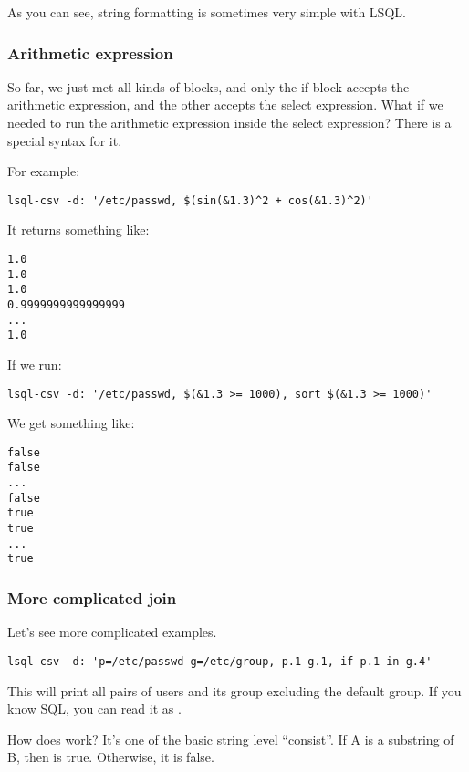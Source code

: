 As you can see, string formatting is sometimes very simple with LSQL.

\subsubsection{Arithmetic expression}
So far, we just met all kinds of blocks, and only the if block accepts the arithmetic expression, and the other accepts the select expression.
What if we needed to run the arithmetic expression inside the select expression? There is a special syntax \icode{\$(\ldots{})} for it.

For example:
\begin{verbatim}
lsql-csv -d: '/etc/passwd, $(sin(&1.3)^2 + cos(&1.3)^2)'
\end{verbatim}

It returns something like:
\begin{verbatim}
1.0
1.0
1.0
0.9999999999999999
...
1.0
\end{verbatim}

If we run:
\begin{verbatim}
lsql-csv -d: '/etc/passwd, $(&1.3 >= 1000), sort $(&1.3 >= 1000)'
\end{verbatim}

We get something like:
\begin{verbatim}
false
false
...
false
true
true
...
true
\end{verbatim}

\subsubsection{More complicated join}
Let's see more complicated examples.
\begin{verbatim}
lsql-csv -d: 'p=/etc/passwd g=/etc/group, p.1 g.1, if p.1 in g.4'
\end{verbatim}
This will print all pairs of users and its group excluding the default group. If you know SQL, you can read it as .

How does  work? It's one of the basic string level ``consist''. If A is a substring of B, then  is true. Otherwise, it is false.

